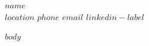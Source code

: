 \documentclass[10pt,a4paper]{article}
\begin{document}
\begin{center}
  {\LARGE\textbf{$name$}}\\[-0.05em]
  $location$ \textbar{} $phone$ \textbar{}
  \href{mailto:$email$}{$email$} \textbar{}
  \href{$linkedin-url$}{$linkedin-label$}
\end{center}

$body$
\end{document}
